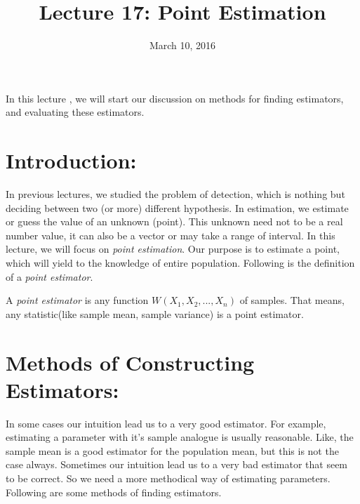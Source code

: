 \documentclass[a4paper,english,12pt]{article}
\title{Lecture 17: Point Estimation}
\date{March 10, 2016}
\author{}
\begin{document}
\maketitle
\maketitle
In this lecture , we will start our discussion on methods for finding estimators, and evaluating these estimators.
\section{Introduction:}
In previous lectures, we studied the problem of detection, which is nothing but deciding between two (or more) different hypothesis. In estimation, we estimate or guess the value of an unknown (point). This unknown need not to be a real number value, it can also be a vector or may take a range of interval. In this lecture, we will focus on \textit{point estimation}. Our purpose is to estimate a point, which will yield to the knowledge of entire population. Following is the definition of a \textit{point estimator}.
\begin{defn}{ A \textit{point estimator} is any function $W(X_1,X_2,...,X_n)$ of samples. That means, any statistic(like sample mean, sample variance) is a point estimator.}
\end{defn}
\section{Methods of Constructing Estimators: }
In some cases our intuition lead us to a very good estimator. For example, estimating a parameter with it's sample analogue is usually reasonable. Like, the sample mean is a good estimator for the population mean, but this is not the case always. Sometimes our intuition lead us to a very bad estimator that seem to be correct. So we need a more methodical way of estimating parameters. Following are some methods of finding estimators.
\end{document}
